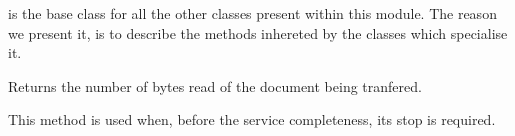 \documentclass{ozdoc}
\begin{document}
 is the base class for all the other classes present within this module. The reason we present it, is to describe the methods inhereted by the classes which specialise it. \mozartEMPTY
 \mozartEMPTY
\begin{mozartDESCRIPTION}
\mozartENTRYHASCODE
\begin{mozartSYNOPSIS}
\begin{mozartCODEDISPLAY}\mozartFACETEXT{)}\end{mozartCODEDISPLAY}
\end{mozartSYNOPSIS}
\mozartITEM Returns the number  of bytes read of the document being tranfered. \mozartEMPTY
{}\mozartENTRYHASCODE
\begin{mozartSYNOPSIS}
\begin{mozartCODEDISPLAY}\mozartFACETEXT{)}\end{mozartCODEDISPLAY}
\end{mozartSYNOPSIS}
\mozartITEM This method is used when, before the service completeness, its stop is required.


\end{mozartDESCRIPTION}
\end{document}
